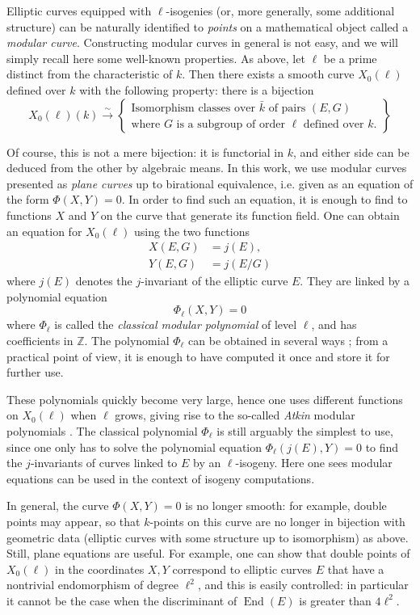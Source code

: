 \documentclass{article}
\newcommand{\Z}{\mathbb{Z}}
\newcommand{\isom}{\overset{\sim}{\longrightarrow}}
\newcommand{\set}[1]{\left\{#1\right\}}
\theoremstyle{definition}
\DeclareMathOperator{\End}{End}
\begin{document}
Elliptic curves equipped with $\ell$-isogenies (or, more generally, some 
additional structure) can be naturally identified to \emph{points} on a 
mathematical object called a \emph{modular curve}. Constructing modular curves 
in general is not easy, and we will simply recall here some well-known 
properties. As above, let $\ell$ be a prime distinct from the characteristic of 
$k$. 
Then there exists a smooth curve $X_0(\ell)$ defined over $k$ with the 
following property: there is a bijection
\[
X_0(\ell)(k) \isom \set{
\begin{matrix}
\text{Isomorphism classes over $\bar{k}$ of pairs $(E, G)$}\\
\text{where $G$ is a subgroup of order $\ell$ defined over $k$.}
\end{matrix}
}
\]

Of course, this is not a mere bijection: it is functorial in $k$, and either
side can be deduced from the other by algebraic means.
In this work, we use modular curves presented as \emph{plane curves} up to 
birational equivalence, i.e. given as an equation of the form
$\Phi(X, Y) = 0.$
In order to find such an equation, it is enough to find to functions $X$ and $Y$
 on the curve that generate its function field. One can obtain an equation for $
X_0(\ell)$ using the two functions
\[
\begin{aligned}
X(E, G) &= j(E), \\
Y(E, G) &= j(E/G)
\end{aligned}
\]
where $j(E)$ denotes the $j$-invariant of the elliptic curve $E$.
They are linked by a polynomial equation
\[
\Phi_\ell(X, Y) = 0
\]
where $\Phi_\ell$ is called the \emph{classical modular polynomial} of level $
\ell$, and has coefficients in $\Z$. The polynomial $\Phi_\ell$ can be
obtained in several ways \cite{};
from a practical point of view, it is enough to have
computed it once and store it for further use.

These polynomials quickly become very large, hence one uses different 
functions on $X_0(\ell)$ when $\ell$ grows, giving rise to the 
so-called \emph{Atkin} modular polynomials \cite{}. The classical polynomial $\Phi_\ell$ 
is still arguably the simplest to use, since one only has to solve the 
polynomial equation $\Phi_\ell(j(E), Y) = 0$ to find the $j$-invariants of 
curves linked to $E$ by an $\ell$-isogeny. Here one sees modular
equations can be used in the context of isogeny computations.

In general, the curve $\Phi(X, Y) = 0$ is no longer smooth: for example, double 
points may appear, so that $k$-points on this curve are no longer in bijection 
with geometric data (elliptic curves with some structure up to isomorphism)
as above. Still, plane equations are useful. For example, 
one can show that double points of $X_0(\ell)$ in the coordinates $X, Y$ 
correspond to elliptic curves $E$ that have a nontrivial endomorphism of degree 
$\ell^2$, and this is easily controlled: in particular it cannot be the case
when the discriminant of $\End(E)$ is greater than $4\ell^2$.
\end{document}
